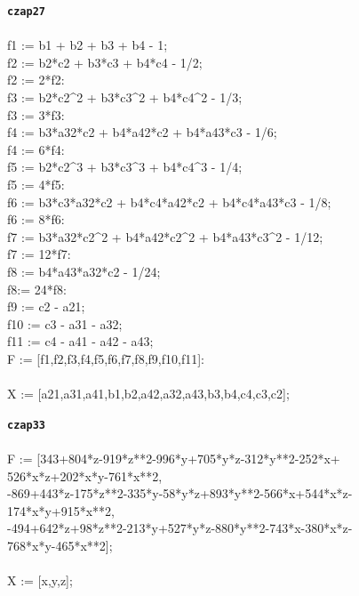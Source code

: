 \documentclass[letterpaper,12pt,titlepage,oneside,final]{book}
\newenvironment{codefont}{\footnotesize\ttfamily}{\par}
\begin{document}
\begin{appendices}
\noindent\textbf{\texttt{czap27}}\\\\
\noindent\begin{codefont}
f1 := b1 + b2 + b3 + b4 - 1;\\
f2 := b2*c2 + b3*c3 + b4*c4 - 1/2;\\
f2 := 2*f2:\\
f3 := b2*c2\^{}2 + b3*c3\^{}2 + b4*c4\^{}2 - 1/3;\\
f3 := 3*f3:\\
f4 := b3*a32*c2 + b4*a42*c2 + b4*a43*c3 - 1/6;\\
f4 := 6*f4:\\
f5 := b2*c2\^{}3 + b3*c3\^{}3 + b4*c4\^{}3 - 1/4;\\
f5 := 4*f5:\\
f6 := b3*c3*a32*c2 + b4*c4*a42*c2 + b4*c4*a43*c3 - 1/8;\\
f6 := 8*f6:\\
f7 := b3*a32*c2\^{}2 + b4*a42*c2\^{}2 + b4*a43*c3\^{}2 - 1/12;\\
f7 := 12*f7:\\
f8 := b4*a43*a32*c2 - 1/24;\\
f8:= 24*f8:\\
f9 := c2 - a21;\\
f10 := c3 - a31 - a32;\\
f11 := c4 - a41 - a42 - a43;\\
F := [f1,f2,f3,f4,f5,f6,f7,f8,f9,f10,f11]:\\
\\
X := [a21,a31,a41,b1,b2,a42,a32,a43,b3,b4,c4,c3,c2];\\
\end{codefont}

\noindent\textbf{\texttt{czap33}}\\\\
\noindent\begin{codefont}
 F := [343+804*z-919*z**2-996*y+705*y*z-312*y**2-252*x+\\526*x*z+202*x*y-761*x**2, \\
-869+443*z-175*z**2-335*y-58*y*z+893*y**2-566*x+544*x*z-\\174*x*y+915*x**2, \\
-494+642*z+98*z**2-213*y+527*y*z-880*y**2-743*x-380*x*z-\\768*x*y-465*x**2];\\
\\
X := [x,y,z];\\
\end{codefont}


\end{appendices}
\end{document}
